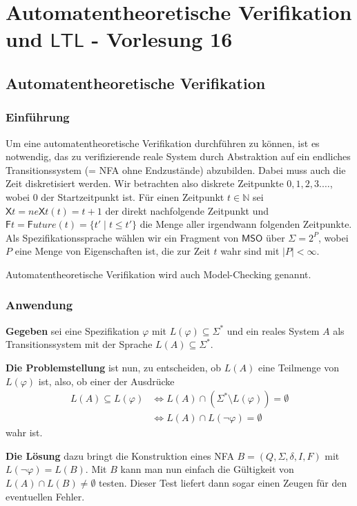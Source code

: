 \documentclass[12pt, german]{article}
\newcommand{\N}{\mathbb{N}}
\newcommand{\sigstern}{\Sigma^\ast}
\newcommand{\mso}{\mathsf{MSO}}
\newcommand{\ltl}{\mathsf{LTL}}
\newcommand{\sX}{\mathsf{X}}
\newcommand{\sF}{\mathsf{F}}
\begin{document}
\section{Automatentheoretische Verifikation und $\ltl$ - Vorlesung 16}
\subsection{Automatentheoretische Verifikation}
\subsubsection{Einführung}
	Um eine automatentheoretische  Verifikation durchführen zu können, ist es notwendig, das zu verifizierende reale System durch Abstraktion auf ein endliches Transitionssystem (= NFA ohne Endzustände) abzubilden. 
	Dabei muss auch die Zeit diskretisiert werden.
	Wir betrachten also diskrete Zeitpunkte $0,1,2,3. \ldots$, wobei $0$ der Startzeitpunkt ist.
	Für einen Zeitpunkt $t \in \N$ sei $\sX t = ne\sX t(t) = t+1$ der direkt nachfolgende Zeitpunkt und $\sF t = \mathsf{F}uture(t) = \{t' \mid t \leq t'\}$ die Menge aller irgendwann folgenden Zeitpunkte. Als Spezifikationssprache wählen wir ein Fragment von $\mso$ über $\Sigma = 2^P$, wobei $P$ eine Menge von Eigenschaften ist, die zur Zeit $t$ wahr sind mit $|P| < \infty$.\newline
	
	Automatentheoretische Verifikation wird auch Model-Checking genannt.
	
\subsubsection{Anwendung}
	\textbf{Gegeben} sei eine Spezifikation $\varphi$ mit $L(\varphi) \subseteq \sigstern$ und ein reales System $A$ als Transitionssystem mit der Sprache $L(A) \subseteq \sigstern$.
	\newline
	
	\textbf{Die Problemstellung} ist nun, zu entscheiden, ob $L(A)$ eine Teilmenge von $L(\varphi)$ ist, also, ob einer der Ausdrücke
	\begin{align*}
	L(A) \subseteq L(\varphi) &\iff L(A) \cap (\sigstern \setminus L(\varphi)) = \emptyset \\
	&\iff L(A) \cap L(\neg \varphi) = \emptyset
	\end{align*} wahr ist.
	\newline
	
	\textbf{Die Lösung} dazu bringt die Konstruktion eines NFA $B = (Q, \Sigma, \delta, I, F)$ mit $L(\neg\varphi) = L(B)$. 
	Mit $B$ kann man nun einfach die Gültigkeit von $L(A) \cap L(B) \neq \emptyset$ testen. Dieser Test liefert dann sogar einen Zeugen für den eventuellen Fehler. 
\end{document}
